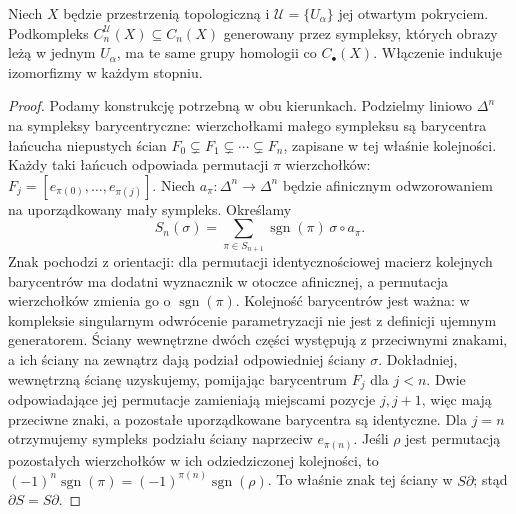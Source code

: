 \begin{lemat}
\label{lem:male-lancuchy}
Niech $X$ będzie przestrzenią topologiczną
i $\mathcal U=\{U_\alpha\}$ jej otwartym pokryciem. Podkompleks
$C_n^{\mathcal U}(X)\subseteq C_n(X)$
generowany przez sympleksy, których obrazy
leżą w jednym $U_\alpha$, ma te same
grupy homologii co $C_\bullet(X)$.
Włączenie indukuje izomorfizmy w każdym stopniu.
\end{lemat}
\begin{proof}
Podamy konstrukcję potrzebną w obu kierunkach.
Podzielmy liniowo $\Delta^n$ na sympleksy
barycentryczne: wierzchołkami małego sympleksu
są barycentra łańcucha niepustych ścian
$F_0\subsetneq F_1\subsetneq\cdots\subsetneq F_n$,
zapisane w tej właśnie kolejności. Każdy taki łańcuch odpowiada
permutacji $\pi$ wierzchołków: $F_j=[e_{\pi(0)},\ldots,e_{\pi(j)}]$.
Niech $a_\pi:\Delta^n\to\Delta^n$ będzie afinicznym odwzorowaniem
na uporządkowany mały sympleks. Określamy
\[
 S_n(\sigma)=\sum_{\pi\in S_{n+1}}\operatorname{sgn}(\pi)
                 \,\sigma\circ a_\pi.
\]
Znak pochodzi z orientacji: dla permutacji identycznościowej
macierz kolejnych barycentrów ma dodatni wyznacznik w otoczce afinicznej,
a permutacja wierzchołków zmienia go o $\operatorname{sgn}(\pi)$.
Kolejność barycentrów jest ważna: w kompleksie singularnym
odwrócenie parametryzacji nie jest z definicji ujemnym generatorem.
Ściany wewnętrzne dwóch części
występują z przeciwnymi znakami,
a ich ściany na zewnątrz dają
podział odpowiedniej ściany $\sigma$.
Dokładniej, wewnętrzną ścianę uzyskujemy, pomijając barycentrum $F_j$
dla $j<n$. Dwie odpowiadające jej permutacje zamieniają miejscami
pozycje $j,j+1$, więc mają przeciwne znaki, a pozostałe
uporządkowane barycentra są identyczne. Dla $j=n$ otrzymujemy
sympleks podziału ściany naprzeciw $e_{\pi(n)}$.
Jeśli $\rho$ jest permutacją pozostałych wierzchołków w ich
odziedziczonej kolejności, to
$(-1)^n\operatorname{sgn}(\pi)=(-1)^{\pi(n)}\operatorname{sgn}(\rho)$.
To właśnie znak tej ściany w $S\partial$; stąd $\partial S=S\partial$.


\end{proof}

